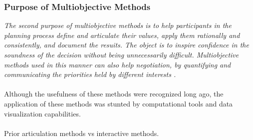\begin{frame}
\begin{columns}
\begin{figure}
{
            }
        \end{figure}
        
    \end{columns}

\end{frame}

\begin{frame}
    \frametitle{Purpose of Multiobjective Methods}

    \textit{The second purpose of multiobjective methods is to help participants
    in the planning process define and articulate their values, apply them
    rationally and consistently, and document the resuits. The object is to
    inspire confidence in the soundness of the decision without being
    unnecessarily difficult. Multiobjective methods used in this manner can also
    help negotiation, by quantifying and communicating the priorities held by
    different interests \cite{hobbs_optimization_1995}.} \\~\\

    Although the usefulness of these methods were recognized long ago, the
    application of these methods was stunted by computational tools and data
    visualization capabilities.\\~\\

    Prior articulation methods vs interactive methods. 

\end{frame}